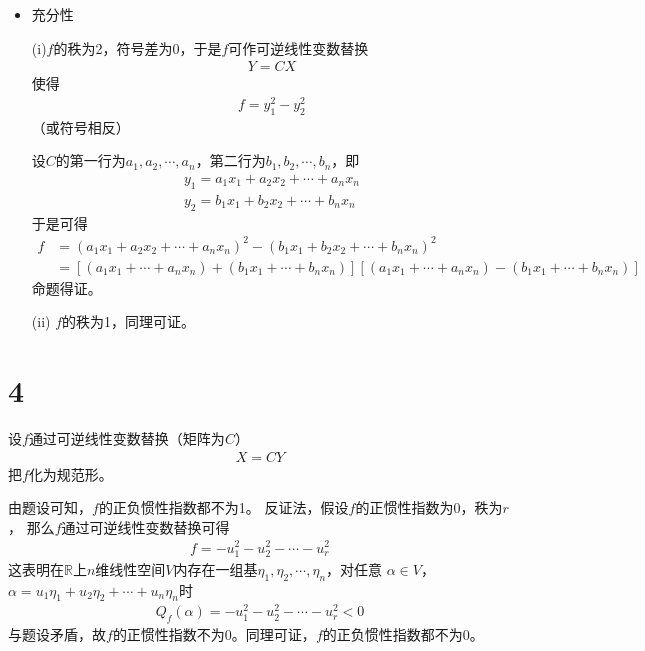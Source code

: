 \documentclass{article}
\begin{document}
\begin{itemize}
  \item 充分性

        (i)$f$的秩为2，符号差为0，于是$f$可作可逆线性变数替换
        \begin{align*}
          Y = C X
        \end{align*}
        使得
        \begin{align*}
          f = y_1^2 - y_2^2
        \end{align*}
        （或符号相反）

        设$C$的第一行为$a_1, a_2, \cdots, a_n$，第二行为$b_1, b_2, \cdots, b_n$，即
        \begin{align*}
          y_1 = a_1 x_1 + a_2 x_2 + \cdots + a_n x_n \\
          y_2 = b_1 x_1 + b_2 x_2 + \cdots + b_n x_n
        \end{align*}
        于是可得
        \begin{align*}
          f & = (a_1 x_1 + a_2 x_2 + \cdots + a_n x_n)^2 - (b_1 x_1 + b_2 x_2 + \cdots + b_n x_n)^2                                         \\
            & = [(a_1 x_1 + \cdots + a_n x_n) + (b_1 x_1 + \cdots + b_n x_n)] [(a_1 x_1 + \cdots + a_n x_n) - (b_1 x_1 + \cdots + b_n x_n)]
        \end{align*}
        命题得证。

        (ii) $f$的秩为1，同理可证。

\end{itemize}

\section*{4}
设$f$通过可逆线性变数替换（矩阵为$C$）
\begin{align*}
  X = C Y
\end{align*}
把$f$化为规范形。

由题设可知，$f$的正负惯性指数都不为1。
反证法，假设$f$的正惯性指数为0，秩为$r$，
那么$f$通过可逆线性变数替换可得
\begin{align*}
  f = - u_1^2 - u_2^2 - \cdots - u_r^2
\end{align*}
这表明在$\mathbb{R}$上$n$维线性空间$V$内存在一组基$\eta_1, \eta_2, \cdots, \eta_n$，对任意
$\alpha \in V$，$\alpha = u_1 \eta_1 + u_2 \eta_2 + \cdots + u_n \eta_n$时
\begin{align*}
  Q_f(\alpha) = - u_1^2 - u_2^2 - \cdots - u_r^2 < 0
\end{align*}
与题设矛盾，故$f$的正惯性指数不为0。同理可证，$f$的正负惯性指数都不为0。
\end{document}
